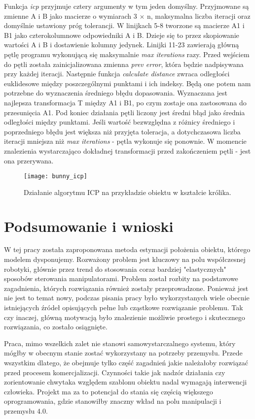 \documentclass[12pt]{article}
\begin{document}
Funkcja \emph{icp} przyjmuje cztery argumenty w tym jeden domyślny. Przyjmowane są zmienne A i B jako macierze o wymiarach 3 $\times$ n, maksymalna liczba iteracji oraz domyślnie ustawiony próg tolerancji. W linijkach 5-8 tworzone są macierze A1 i B1 jako czterokolumnowe odpowiedniki A i B. Dzieje się to przez skopiowanie wartości A i B i dostawienie kolumny jedynek. Linijki 11-23 zawierają główną pętlę programu wykonującą się maksymalnie \emph{max iterations} razy. Przed wejściem do pętli została zainicjalizowana zmienna \emph{prev error}, która będzie nadpisywana przy każdej iteracji. Następnie funkcja \emph{calculate distance} zwraca odległości euklidesowe między poszczególnymi punktami i ich indeksy. Będą one potem nam potrzebne do wyznaczenia średniego błędu dopasowania. Wyznaczana jest najlepsza transformacja T między A1 i B1, po czym zostaje ona zastosowana do przesunięcia A1. Pod koniec działania pętli liczony jest średni błąd jako średnia odległości między punktami. Jeśli wartość bezwzględna z różnicy średniego i poprzedniego błędu jest większa niż przyjęta toleracja, a dotychczasowa liczba iteracji mniejsza niż \emph{max iterations} - pętla wykonuje się ponownie. W momencie znalezienia wystarczająco dokładnej transformacji przed zakończeniem pętli - jest ona przerywana.

\begin{figure}[h!]
\centering
\texttt{[image: bunny\_icp]}
\caption{Działanie algorytmu ICP na przykładzie obiektu w kształcie królika.}
\end{figure}

\newpage
\section{Podsumowanie i wnioski}
W tej pracy została zaproponowana metoda estymacji położenia obiektu, którego modelem dysponujemy. Rozważony problem jest kluczowy na polu współczesnej robotyki, głównie przez trend do stosowania coraz bardziej "elastycznych" sposobów sterowania manipulatorami. Problem został rozbity na podstawowe zagadnienia, których rozwiązania również zostały przeprowadzone. Ponieważ jest nie jest to temat nowy, podczas pisania pracy było wykorzystanych wiele obecnie istniejących źródeł opisujących pełne lub cząstkowe rozwiązanie problemu. Tak czy inaczej, główną motywacją było znalezienie możliwie prostego i skutecznego rozwiązania, co zostało osiągnięte.

Praca, mimo wszelkich zalet nie stanowi samowystarczalnego systemu, który mógłby w obecnym stanie zostać wykorzystany na potrzeby przemysłu. Przede wszystkim dlatego, że obejmuje tylko część zagadnień jakie należałoby rozwiązać przed procesem komercjalizacji. Czynności takie jak nadzór działania czy zorientowanie chwytaka względem szablonu obiektu nadal wymagają interwencji człowieka. Projekt ma za to potencjał do stania się częścią większego oprogramowania, gdzie stanowiłby znaczny wkład na polu manipulacji i przemysłu 4.0.
\end{document}
